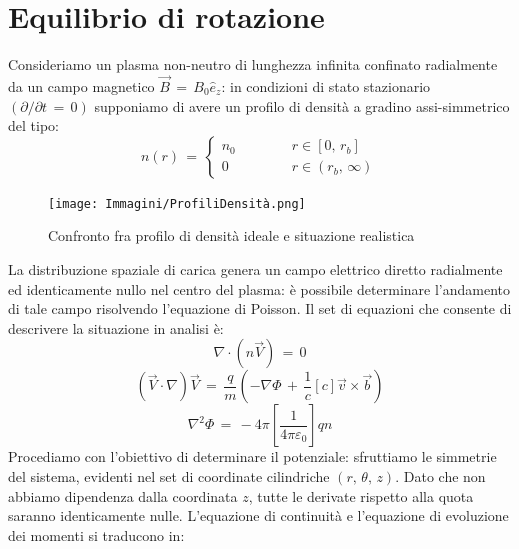 \section{Equilibrio di rotazione}

Consideriamo un plasma non-neutro di lunghezza infinita confinato radialmente da un campo magnetico $\vec{B}\,=\,B_0 \hat{e}_z$: 
in condizioni di stato stazionario $\left(\partial/\partial t\,=\,0\right)$ supponiamo di avere un profilo di densità a gradino 
assi-simmetrico del tipo:
\begin{equation}
    n\left(r\right)\,=\,
\begin{cases}
    n_0 \qquad \qquad r \in \left[0,\,r_b\right] \\
    0\,\,\, \qquad \qquad r \in \left(r_b,\,\infty\right)
\end{cases}
\label{equation: eq_density}
\end{equation}
\begin{figure}[H]
    \centering
    \texttt{[image: Immagini/ProfiliDensità.png]}
    \caption{Confronto fra profilo di densità ideale e situazione realistica}
    \label{figure: ProfDens}
\end{figure}
La distribuzione spaziale di carica genera un campo elettrico diretto radialmente ed identicamente nullo nel centro del 
plasma: è possibile determinare l'andamento di tale campo risolvendo l'equazione di Poisson. Il set di equazioni che consente 
di descrivere la situazione in analisi è:
\begin{equation}
    \nabla \cdot \left(n\vec{V}\right)\,=\,0
    \label{equation: conteq_steadystate}
\end{equation}
\begin{equation}
    \left(\vec{V}\cdot \nabla\right)\vec{V}\,=\,\frac{q}{m}\left(-\nabla\Phi\,+\,\frac{1}{c}\left[c\right]\vec{v} \times \vec{b}\right)
    \label{equation: forcebalance_steadystate}
\end{equation}
\begin{equation}
    \nabla^2\Phi\,=\,-4\pi\left[\frac{1}{4\pi\varepsilon_0}\right]qn
    \label{equation: Poisson_steadystate}
\end{equation}
Procediamo con l'obiettivo di determinare il potenziale: sfruttiamo le simmetrie del sistema, evidenti nel set di coordinate
cilindriche $\left(r,\,\theta,\,z\right)$. Dato che non abbiamo dipendenza dalla coordinata $z$, tutte le derivate rispetto alla 
quota saranno identicamente nulle. L'equazione di continuità e l'equazione di evoluzione dei momenti si traducono in:
